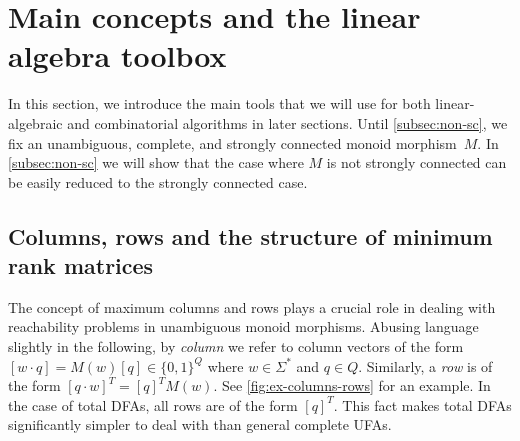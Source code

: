 \section{Main concepts and the linear algebra toolbox}\label{sec-toolbox}
In this section, we introduce the main tools that we will use for both linear-algebraic and combinatorial algorithms in later sections.
Until \autoref{subsec:non-sc}, we fix an unambiguous, complete, and strongly connected monoid morphism~$M$. In \autoref{subsec:non-sc} we will show that the case where $M$ is not strongly connected can be easily reduced to the strongly connected case.


\subsection{Columns, rows and the structure of minimum rank matrices}\label{subsec:col-row-defs}

The concept of maximum columns and rows plays a crucial role in dealing with reachability problems in unambiguous monoid morphisms. Abusing language slightly in the following, by \emph{column} we refer to column vectors of the form $[w \cdot q] = M(w)[q] \in \{0,1\}^Q$ where $w \in \Sigma^*$ and $q \in Q$.
Similarly, a \emph{row} is of the form $[q \cdot w]^T = [q]^T M(w)$. See \autoref{fig:ex-columns-rows} for an example. In the case of total DFAs, all rows are of the form $[q]^T$. This fact makes total DFAs significantly simpler to deal with than general complete UFAs.


